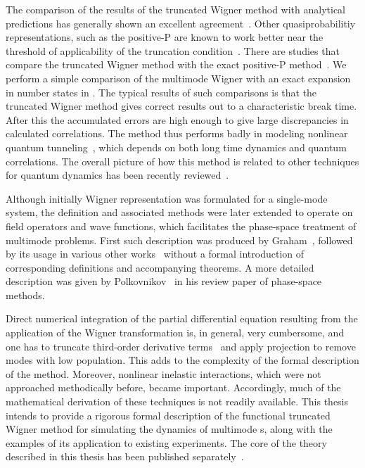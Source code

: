 The comparison of the results of the truncated Wigner method with analytical predictions has generally shown an excellent agreement~\cite{Corney2006,Deuar2007}.
Other quasiprobabilitiy representations, such as the positive-P are known to work better near the threshold of applicability of the truncation condition~\cite{Deuar2007,Hoffmann2008}.
There are studies that compare the truncated Wigner method with the exact positive-P method~\cite{Chaturvedi2002,Dechoum2004}.
We perform a simple comparison of the multimode Wigner with an exact expansion in number states in .
The typical results of such comparisons is that the truncated Wigner method gives correct results out to a characteristic break time.
After this the accumulated errors are high enough to give large discrepancies in calculated correlations.
The method thus performs badly in modeling nonlinear quantum tunneling~\cite{Drummond1989,Kinsler1991a}, which depends on both long time dynamics and quantum correlations.
The overall picture of how this method is related to other techniques for quantum dynamics has been recently reviewed~\cite{He2012}.

Although initially Wigner representation was formulated for a single-mode system, the definition and associated methods were later extended to operate on field operators and wave functions,
which facilitates the phase-space treatment of multimode problems.
First such description was produced by Graham~\cite{Graham1970,Graham1970a}, followed by its usage in various other works~\cite{Steel1998,Gardiner2003,Isella2006,Norrie2006,Norrie2006a,Blakie2008,Martin2010} without a formal introduction of corresponding definitions and accompanying theorems.
A more detailed description was given by Polkovnikov~\cite{Polkovnikov2010} in his review paper of phase-space methods.

Direct numerical integration of the partial differential equation resulting from the application of the Wigner transformation is, in general, very cumbersome, and one has to truncate third-order derivative terms~\cite{Drummond1993,Steel1998,Sinatra2002} and apply projection to remove modes with low population.
This adds to the complexity of the formal description of the method.
Moreover, nonlinear inelastic interactions, which were not approached methodically before, became important.
Accordingly, much of the mathematical derivation of these techniques is not readily available.
This thesis intends to provide a rigorous formal description of the functional truncated Wigner method for simulating the dynamics of multimode s, along with the examples of its application to existing experiments.
The core of the theory described in this thesis has been published separately~\cite{Opanchuk2013}.


